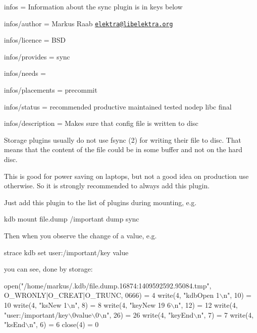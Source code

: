 
\begin{DoxyItemize}
\item infos = Information about the sync plugin is in keys below
\item infos/author = Markus Raab \href{mailto:elektra@libelektra.org}{\tt elektra@libelektra.\+org}
\item infos/licence = B\+SD
\item infos/provides = sync
\item infos/needs =
\item infos/placements = precommit
\item infos/status = recommended productive maintained tested nodep libc final
\item infos/description = Makes sure that config file is written to disc
\end{DoxyItemize}

Storage plugins usually do not use fsync (2) for writing their file to disc. That means that the content of the file could be in some buffer and not on the hard disc.

This is good for power saving on laptops, but not a good idea on production use otherwise. So it is strongly recommended to always add this plugin.

Just add this plugin to the list of plugins during mounting, e.\+g.


\begin{DoxyCode}
kdb mount file.dump /important dump sync
\end{DoxyCode}


Then when you observe the change of a value, e.\+g.


\begin{DoxyCode}
strace kdb set user:/important/key value
\end{DoxyCode}


you can see, done by storage\+:


\begin{DoxyCode}
open("/home/markus/.kdb/file.dump.16874:1409592592.95084.tmp",
        O\_WRONLY|O\_CREAT|O\_TRUNC, 0666) = 4
write(4, "kdbOpen 1\(\backslash\)n", 10)             = 10
write(4, "ksNew 1\(\backslash\)n", 8)                = 8
write(4, "keyNew 19 6\(\backslash\)n", 12)           = 12
write(4, "user:/important/key\(\backslash\)0value\(\backslash\)0\(\backslash\)n", 26) = 26
write(4, "keyEnd\(\backslash\)n", 7)                 = 7
write(4, "ksEnd\(\backslash\)n", 6)                  = 6
close(4)                                = 0
\end{DoxyCode}


